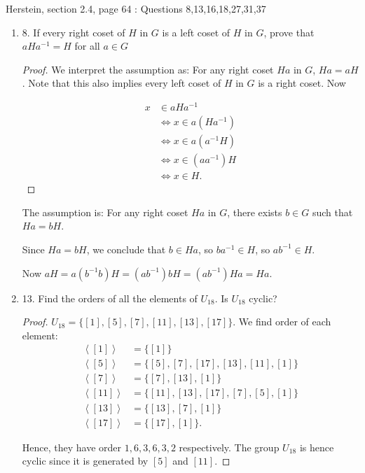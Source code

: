 
Herstein, section 2.4, page 64 : Questions 8,13,16,18,27,31,37 
\begin{enumerate}
	\item 8. If every right coset of $H$ in $G$ is a left coset of $H$ in $G$, prove that $a H a^{-1}=H$ for all $a \in G$
\begin{proof}
	We interpret the assumption as: For any right coset $Ha$ in $G$,  $Ha = aH$. Note that this also implies every left coset of $H$ in $G$ is a right coset. Now

	\begin{align*}
		x &\in aHa^{-1} \\
		  &\iff x \in a (Ha^{-1} )\\
		  &\iff x \in a (a^{-1} H)\\
		  &\iff x \in (aa^{-1} )H \\
		  &\iff x \in H
	.\end{align*}
\end{proof}
\begin{correction}
	The assumption is: For any right coset $Ha$ in $G$, there exists $b \in G$ such that $Ha = bH$. 

	Since $Ha = bH$, we conclude that $b \in Ha$, so $ba^{-1} \in H$, so $ab^{-1} \in H$.

	Now $aH = a(b^{-1} b)H = (ab^{-1} )bH = (ab^{-1} ) Ha = Ha$.
\end{correction}

	\item 13. Find the orders of all the elements of $U_{18}$. Is $U_{18}$ cyclic?
\begin{proof}
	$U_{18} = \{[1],[5],[7],[11],[13],[17]\} $.
We find order of each element:
\begin{align*}
	\left\langle [ 1  ]\right\rangle &= \{[1]\}  \\
	\left\langle [5] \right\rangle &= \{[5],[7],[17],[13],[11],[1]\}  \\
	\left\langle [7] \right\rangle &= \{[7],[13],[1]\}  \\
	\left\langle [ 11 ] \right\rangle &= \{[11],[13],[17],[7],[5],[1]\}  \\
	\left\langle [ 13 ] \right\rangle &= \{[13],[7],[1]\}  \\
	\left\langle [ 17 ] \right\rangle &= \{[17],[1]\}
.\end{align*}

Hence, they have order $1, 6, 3, 6, 3, 2$ respectively. The group $U_{18}$ is hence cyclic since it is generated by $[5]$ and $[11]$.
\end{proof}


\end{enumerate}

